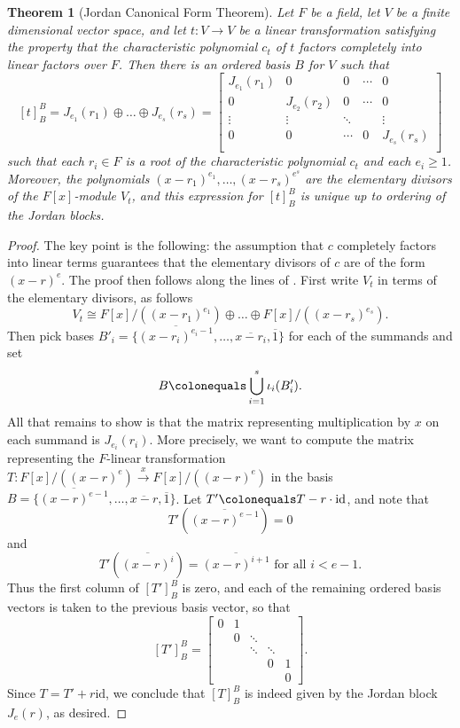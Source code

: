 \documentclass[12pt]{report}
\newtheorem{theorem}{Theorem}[chapter]
\numberwithin{equation}{section}
\numberwithin{theorem}{chapter}
\theoremstyle{definition}
\newtheorem*{basic properties}{Basic Properties}
\newtheorem*{Important Remark}{Important Remark}
\begin{document}
\begin{theorem}[Jordan Canonical Form Theorem]\label{JCF}
Let $F$ be a field, let $V$ be a finite dimensional vector space, and let $t: V \to V$ be a linear transformation satisfying the property that the characteristic polynomial $c_t$ of $t$ factors completely into linear factors over $F$. Then there is an ordered basis $B$ for $V$ such that 
$$[t]_B^B = J_{e_1}(r_1) \oplus \dots \oplus J_{e_s}(r_s)=
\begin{bmatrix}
J_{e_1}(r_1) & 0 & 0 & \cdots & 0 \\
0 &  J_{e_2}(r_2)  & 0 & \cdots & 0 \\
\vdots & \vdots & \ddots &  & \vdots \\
0 & 0 & \cdots & 0 &  J_{e_s}(r_s) \\
\end{bmatrix}$$ 
such that each $r_i \in F$ is a root of the characteristic polynomial $c_t$ and each $e_i \geqslant 1$. Moreover, the polynomials $(x - r_1)^{e_1},\ldots,(x - r_s)^{e^s}$ are the elementary divisors of the $F[x]$-module $V_t$, and this expression for $[t]_B^B$ is unique up to ordering of the Jordan blocks.
\end{theorem}
 
 
\begin{proof}
The key point is the following: the assumption that $c$ completely factors into linear terms guarantees that the elementary divisors of $c$ are of the form $(x-r)^e$.
The proof then follows along the lines of . 
First write $V_t$ in terms of the elementary divisors, as follows $$V_t\cong F[x]/((x - r_1)^{e_1})\oplus \dots \oplus F[x]/((x - r_s)^{e_s}).$$
Then pick bases $B'_i=\{\overline{(x-r_i)^{e_i-1}}, \ldots, \overline{x-r_i}, \overline{1}\}$ for each of the summands and set 
$$B \colonequals \bigcup_{i=1}^s \iota_i(B'_i).$$
All that remains to show is that the matrix representing multiplication by $x$ on each summand is $J_{e_i}(r_i)$. More precisely, we want to compute the matrix representing the $F$-linear transformation $T\!: F[x]/((x-r)^e) \xrightarrow{x} F[x]/((x-r)^e)$ in the basis $B = \{\overline{(x-r)^{e-1}}, \ldots, \overline{x-r}, \overline{1}\}$. Let $T' \colonequals T - r \cdot \mathrm{id}$, and note that
$$T'(\overline{(x-r)^{e-1}}) = 0$$
and
$$T'(\overline{(x-r)^{i}}) = \overline{(x-r)^{i+1}} \textrm{ for all } i < e-1.$$
Thus the first column of $[T']_B^B$ is zero, and each of the remaining ordered basis vectors is taken to the previous basis vector, so that
$$[T']_B^B = \begin{bmatrix}
0 & 1 &  \\
& 0 & \ddots \\
& & \ddots & \ddots\\
& & & 0 & 1\\
&&&& 0	
\end{bmatrix}.
$$
Since $T = T' + r \mathrm{id}$, we conclude that $[T]_B^B$ is indeed given by the Jordan block $J_{e}(r)$, as desired.
\end{proof}
\end{document}
